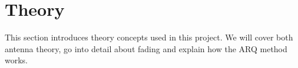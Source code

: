 \section{Theory}\label{ch:theory}

This section introduces theory concepts used in this project. We will cover both antenna theory, go into detail about fading and explain how the ARQ method works.









